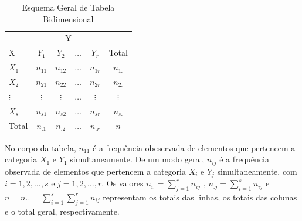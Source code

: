 \begin{table}[!htb]
    \centering
    {
    \caption{Esquema Geral de Tabela Bidimensional}
    \label{Bidimensional}
    \vspace{0.2cm}
\begin{tabular}{l|c|c|c|c|c}
  \hline\hline
                     &  \multicolumn{4}{c}{Y} \\
  \cline{2-5}
  X                  & $Y_{1}$     & $Y_{2}$     & $\ldots$    & $Y_{r}$  & Total \\
  \hline
  $X_{1}$            & $ n_{11}$   & $ n_{12}$   & $\ldots$    & $n_{1r}$ & $n_{1.}$ \\
  $X_{2}$            & $ n_{21}$   & $ n_{22}$   & $\ldots$    & $n_{2r}$ & $n_{2.}$  \\
  $\vdots$           & $\vdots$    & $\vdots$    & $\ldots$    & $\vdots$ & $\vdots$ \\
  $X_{s}$            & $ n_{s1}$   & $ n_{s2}$   & $\ldots$    & $n_{sr}$ & $n_{s.}$ \\
  \hline\hline
  Total              & $n_{.1}$    & $n_{.2}$    & $\ldots$    & $n_{.r}$ & $n$ \\
   \hline\hline
\end{tabular}}
\end{table}


No corpo da tabela, $n_{11}$ é a frequência obeservada de
elementos que pertencem a categoria $X_{1}$ e $Y_{1}$
 simultaneamente. De um modo geral, $n_{ij}$ é a frequência observada de elementos que pertencem a categoria
 $X_{i}$ e $Y_{j}$ simultaneamente, com $i=1,2, \ldots,s $ e $j=1,2, \ldots ,r $. Os valores
 $n_{i.}=\sum_{j=1}^{r}n_{ij}$ , $n_{.j}=\sum_{i=1}^{s}n_{ij}$ e $n=n..=\sum_{i=1}^{s}\sum_{j=1}^{r}n_{ij}$
representam os totais das linhas, os totais das colunas e o total
geral, respectivamente.















